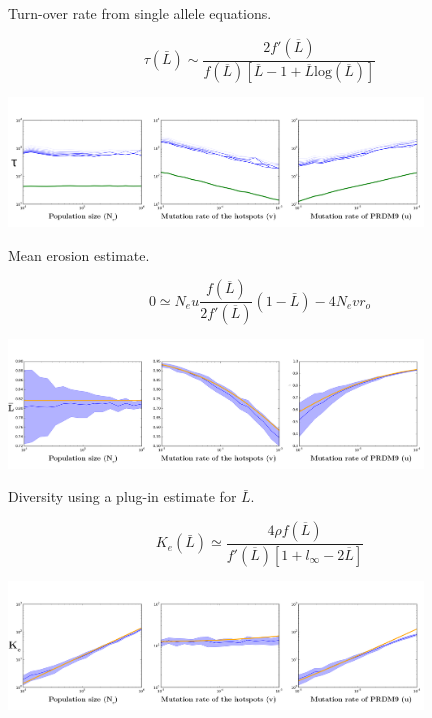 \documentclass[10pt]{beamer}
\begin{document}
\begin{frame}
	\begin{center}
		\Large
    Turn-over rate from single allele equations.
	\end{center}
\[
  \tau (\bar{L}) \sim \dfrac{2 f'(\overline{L})}{f(\overline{L})[\overline{L}-1 + \overline{L} \mathrm{log}(\overline{L})]}
\]
	\begin{center}
       \includegraphics[width=11cm]{Images/approximated-turn-over.png}
	\end{center}
\end{frame}

\begin{frame}
	\begin{center}
		\Large
    Mean erosion estimate.
	\end{center}
\[
  0 \simeq N_e u \dfrac{f(\overline{L})}{2f'(\overline{L})} (1 - \bar{L}) -
  4 N_e v r_o
\]
	\begin{center}
       \includegraphics[width=11cm]{Images/estimated-mean-erosion.png}
	\end{center}
\end{frame}

\begin{frame}
	\begin{center}
		\Large
    Diversity using a plug-in estimate for $\bar{L}$.
	\end{center}
\[
  K_e(\bar{L}) \simeq 
  \dfrac{4 \rho f(\overline{L})}{f'(\overline{L})\left[ 1 + l_{\infty} - 2 \overline{L}  \right]}
\]
	\begin{center}
       \includegraphics[width=11cm]{Images/estimated-diversity.png}
	\end{center}
\end{frame}
\end{document}
